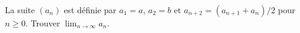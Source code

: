 La suite $(a_n)$ est définie par $a_1 = a$, $a_2 = b$ et $a_{n+2} = (a_{n+1} + a_n)/2$ pour $n \geq 0$. Trouver $\lim_{n\to\infty} a_n$.
